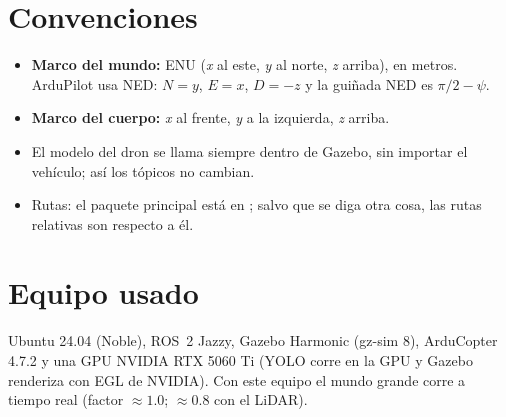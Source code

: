 \section{Convenciones}

\begin{itemize}
  \item \textbf{Marco del mundo:} ENU (\emph{x} al este, \emph{y} al norte, \emph{z} arriba), en
        metros. ArduPilot usa NED: $N = y$, $E = x$, $D = -z$ y la guiñada NED es
        $\pi/2 - \psi$.
  \item \textbf{Marco del cuerpo:} \emph{x} al frente, \emph{y} a la izquierda, \emph{z} arriba.
  \item El modelo del dron se llama siempre  dentro de Gazebo, sin importar
        el vehículo; así los tópicos no cambian.
  \item Rutas: el paquete principal está en ; salvo que se
        diga otra cosa, las rutas relativas son respecto a él.
\end{itemize}

\section{Equipo usado}

Ubuntu 24.04 (Noble), ROS~2 Jazzy, Gazebo Harmonic (gz-sim 8), ArduCopter 4.7.2 y una GPU
NVIDIA RTX 5060 Ti (YOLO corre en la GPU y Gazebo renderiza con EGL de NVIDIA). Con este equipo
el mundo grande corre a tiempo real (factor $\approx 1.0$; $\approx 0.8$ con el LiDAR).
